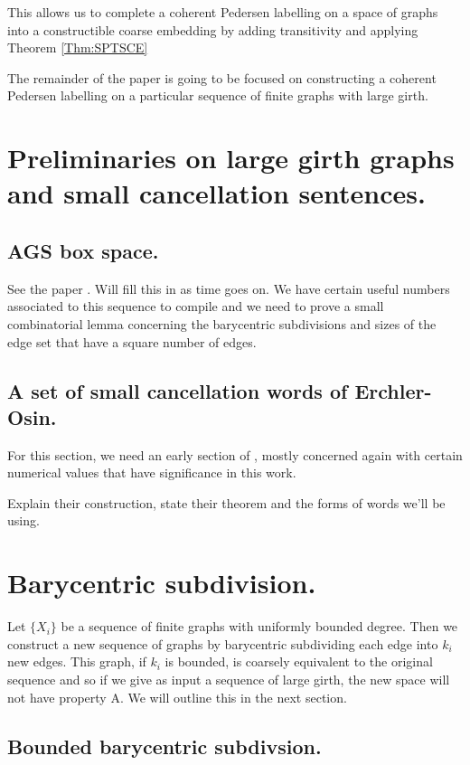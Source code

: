 \documentclass[11pt,a4paper]{amsart}
\theoremstyle{plain}
\theoremstyle{definition}%
\theoremstyle{remark}%
\begin{document}
This allows us to complete a coherent Pedersen labelling on a space of graphs into a constructible coarse embedding by adding transitivity and applying Theorem \ref{Thm:SPTSCE}

The remainder of the paper is going to be focused on constructing a coherent Pedersen labelling on a particular sequence of finite graphs with large girth.

\section{Preliminaries on large girth graphs and small cancellation sentences.}

\subsection{AGS box space.}

See the paper \cite{}. Will fill this in as time goes on. We have certain useful numbers associated to this sequence to compile and we need to prove a small combinatorial lemma concerning the barycentric subdivisions and sizes of the edge set that have a square number of edges.

\subsection{A set of small cancellation words of Erchler-Osin.}

For this section, we need an early section of \cite{}, mostly concerned again with certain numerical values that have significance in this work.

Explain their construction, state their theorem and the forms of words we'll be using.

\section{Barycentric subdivision.}

Let $\lbrace X_{i} \rbrace$ be a sequence of finite graphs with uniformly bounded degree. Then we construct a new sequence of graphs by barycentric subdividing each edge into $k_{i}$ new edges. This graph, if $k_{i}$ is bounded, is coarsely equivalent to the original sequence and so if we give as input a sequence of large girth, the new space will not have property A. We will outline this in the next section.

\subsection{Bounded barycentric subdivsion.}
\end{document}
